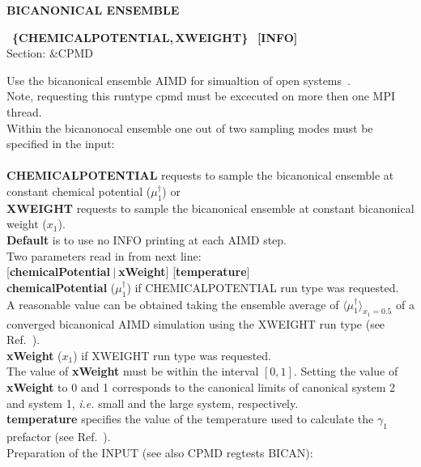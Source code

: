 \documentclass[twoside,10pt,titlepage,a4paper]{article}
\newcommand{\reflabel}[1]{\hypertarget{#1}}
\newcommand{\reflabel}[1]{\label{#1}}
\newcommand{\keyword}[5]{%
\vspace{1.0cm}
\begin{minipage}{15cm}
\reflabel{#1}{\textbf{\large #1}}%
\index{#1}%
\ \textbf{#2}%
\ \textbf{#3}%
\ \textit{#4}%
     \hfill\\\smallskip
     {Section: #5}
     \hfill\\\smallskip\vskip 10pt
\end{minipage}
}%
\newcommand{\desc}[1]{%
   \hspace*{\fill} \parbox{130mm}{\sloppy
                          {#1}%
                             }
     \hfill\\\smallskip
   }%
\newcommand{\desc}[1]{#1\vspace{1ex}}
\begin{document}
\keyword{BICANONICAL ENSEMBLE}{\{CHEMICALPOTENTIAL,\,XWEIGHT\} }{[INFO]}{}{\&CPMD}
  \desc{Use the bicanonical ensemble AIMD for simualtion of open
    systems~\cite{Frenzel2017}. 
    \\
    Note, requesting this runtype cpmd must be excecuted on more then one MPI
    thread.
    \\
    Within the bicanonocal ensemble one out of two sampling modes must be 
    specified in the input:\\
    \\[0.5em]
    \textbf{CHEMICALPOTENTIAL} requests to sample the bicanonical ensemble at
    constant chemical potential ($\mu^\dagger_1$) or 
    \\[0.25em]
    \textbf{XWEIGHT} requests to sample the bicanonical ensemble at constant
    bicanonical weight ($x_1$).
    \\[0.25em]
    \textbf{Default} is to use no INFO printing at each AIMD step. 
    \\[1em]
    Two parameters read in from next line: 
    \\[0.5em]
    [\textbf{chemicalPotential}$~|~$\textbf{xWeight}]  [\textbf{temperature}]
    \\[0.5em]
    \textbf{chemicalPotential} 
    ($\mu^\dagger_1$) if CHEMICALPOTENTIAL run type was requested. 
    \\[0.25em]
    A reasonable value can be obtained taking the ensemble average of $\langle
    \mu^\dagger_1 \rangle_{x_1=0.5}$ of a converged bicanonical AIMD simulation
    using the XWEIGHT run type (see Ref.~\cite{Frenzel2017}).
    \\[0.5em]
    \textbf{xWeight} ($x_1$) if XWEIGHT run type was requested. 
    \\[0.25em]
    The value of \textbf{xWeight} must be within the interval $[0,1]$. 
    Setting the value of \textbf{xWeight} to 0 and 1 corresponds to the
    canonical limits of canonical system 2 and system 1, \textit{i.e.\@} small
    and the large system, respectively.
    \\[0.5em]
    \textbf{temperature} specifies the value of the temperature used to calculate 
    the $\gamma_1$ prefactor (see Ref.~\cite{Frenzel2017}).
    \\[1em]
    Preparation of the INPUT (see also CPMD regtests BICAN):
    \\[0.25em]
}
\end{document}
